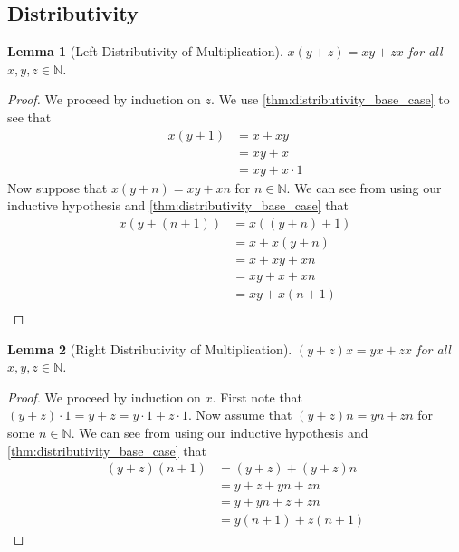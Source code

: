 \documentclass{article}
\theoremstyle{definition}
\theoremstyle{definition}
\theoremstyle{plain}
\theoremstyle{remark}
\theoremstyle{plain}
\theoremstyle{remark}
\theoremstyle{plain}
\newtheorem{lemma}{Lemma}[section]
\theoremstyle{plain}
\theoremstyle{plain}
\theoremstyle{plain}
\begin{document}
\subsection{Distributivity}

\begin{lemma}[Left Distributivity of Multiplication]
   \( x (y + z) =  xy + zx \) for all \( x, y, z \in \mathbb{N} \).
   \label{thm:left_distributivity}
\end{lemma}

\begin{proof}
  We proceed by induction on \( z \). We use 
  \autoref{thm:distributivity_base_case} to see that
  \begin{align*}
    x(y+1) &= x + xy \\
           &= xy + x \\
           &= xy + x \cdot 1   
  \end{align*}
  Now suppose that \( x (y + n) = xy + xn \) for \( n \in \mathbb{N} \). We 
  can see from using our inductive hypothesis and 
  \autoref{thm:distributivity_base_case} that 
  \begin{align*}
    x(y+(n+1)) &= x((y + n) + 1) \\
               &= x + x(y + n) \\
               &= x + xy + xn \\
               &= xy + x + xn \\
               &= xy + x ( n + 1) \\
  \end{align*}
\end{proof}

\begin{lemma}[Right Distributivity of Multiplication]
  \( (y + z)x = yx + zx \) for all \( x, y, z \in \mathbb{N} \). 
  \label{thm:right_distributivity}
\end{lemma}

\begin{proof}
  We proceed by induction on \( x \). First note that 
  \( (y + z) \cdot 1 = y + z = y \cdot 1 + z \cdot 1 \). Now assume that 
  \( (y + z)n = yn + zn \) for some \( n \in \mathbb{N} \). We 
  can see from using our inductive hypothesis and 
  \autoref{thm:distributivity_base_case} that 
  \begin{align*}
    (y + z)(n+1) &= (y + z) + (y + z)n \\
                 &= y + z + yn + zn \\
                 &= y + yn + z + zn \\
                 &= y(n+1) + z(n+1) 
  \end{align*}
\end{proof}
\end{document}
